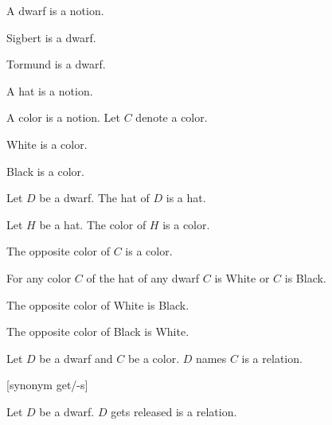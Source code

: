 \documentclass{article}
\begin{document}
\begin{forthel}

  \begin{signature}
    A dwarf is a notion.
  \end{signature}
  
  \begin{signature}
    Sigbert is a dwarf.
  \end{signature}

  \begin{signature}
    Tormund is a dwarf.
  \end{signature}

  \begin{signature}
    A hat is a notion.
  \end{signature}

  \begin{signature}
    A color is a notion.
    Let $C$ denote a color.
  \end{signature}

  \begin{signature}
    White is a color.
  \end{signature}

  \begin{signature}
    Black is a color.
  \end{signature}

  \begin{signature}
    Let $D$ be a dwarf.
    The hat of $D$ is a hat.
  \end{signature}

  \begin{signature}
    Let $H$ be a hat.
    The color of $H$ is a color.
  \end{signature}

  \begin{signature}
    The opposite color of $C$ is a color.
  \end{signature}

  \begin{axiom}
    For any color $C$ of the hat of any dwarf $C$ is White or $C$ is Black.
  \end{axiom}

  \begin{axiom}
    The opposite color of White is Black.
  \end{axiom}

  \begin{axiom}
    The opposite color of Black is White.
  \end{axiom}

  \begin{signature}
    Let $D$ be a dwarf and $C$ be a color.
    $D$ names $C$ is a relation.
  \end{signature}

  [synonym get/-s]

  \begin{signature}
    Let $D$ be a dwarf.
    $D$ gets released is a relation.
  \end{signature}
\end{forthel}
\end{document}
